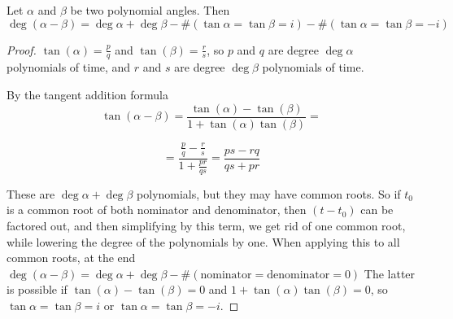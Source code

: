 \documentclass[a4paper]{article}
\begin{document}
\begin{theorem}
    Let $\alpha$ and $\beta$ be two polynomial angles. Then
    $$\deg (\alpha-\beta)=\deg \alpha + \deg \beta - \#(\tan\alpha = \tan \beta = i) - \#(\tan\alpha = \tan \beta = -i)$$
\end{theorem}
\begin{proof}
    $\tan(\alpha)=\frac{p}{q}$ and $\tan(\beta)=\frac{r}{s}$, so $p$ and $q$ are degree $\deg \alpha$ polynomials of time, and $r$ and $s$ are degree $\deg \beta$ polynomials of time.

    By the tangent addition formula $$\tan(\alpha-\beta)=\frac{\tan(\alpha)-\tan(\beta)}{1+\tan(\alpha)\tan(\beta)}=$$

    $$=\frac{\frac{p}{q}-\frac{r}{s}}{1+\frac{pr}{qs}}=\frac{ps-rq}{qs+pr}$$

These are $\deg \alpha + \deg \beta$ polynomials, but they may have common roots. So if $t_0 $ is a common root of both nominator and denominator, then $(t-t_0)$ can be factored out, and then simplifying by this term, we get rid of one common root, while lowering the degree of the polynomials by one. When applying this to all common roots, at the end $\deg (\alpha-\beta)=\deg \alpha + \deg \beta - \#(\text{nominator}=\text{denominator}=0)$
The latter is possible if $\tan(\alpha)-\tan(\beta)=0$ and $1+\tan(\alpha)\tan(\beta)=0$, so $\tan\alpha = \tan \beta = i$ or $\tan\alpha = \tan \beta = -i$.
\end{proof}



\end{document}

